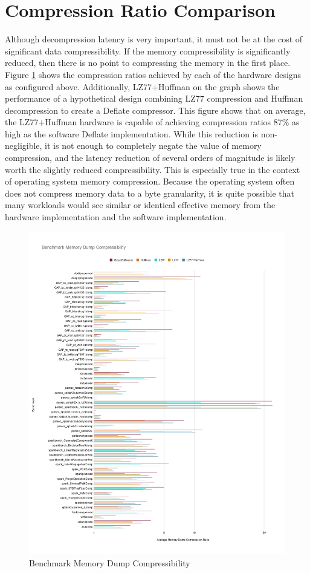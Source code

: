 \documentclass[doublespace,nopageskip]{VTthesis}
\begin{document}
\section{Compression Ratio Comparison}\label{se:compression_ratio_comparison_results}
Although decompression latency is very important, it must not be at the cost of significant data compressibility. If the memory compressibility is significantly reduced, then there is no point to compressing the memory in the first place. Figure \ref{fig:benchmark_memory_dump_compressibility} shows the compression ratios achieved by each of the hardware designs as configured above. Additionally, LZ77+Huffman on the graph shows the performance of a hypothetical design combining LZ77 compression and Huffman decompression to create a Deflate compressor. This figure shows that on average, the LZ77+Huffman hardware is capable of achieving compression ratios 87\% as high as the software Deflate implementation. While this reduction is non-negligible, it is not enough to completely negate the value of memory compression, and the latency reduction of several orders of magnitude is likely worth the slightly reduced compressibility. This is especially true in the context of operating system memory compression. Because the operating system often does not compress memory data to a byte granularity, it is quite possible that many workloads would see similar or identical effective memory from the hardware implementation and the software implementation.

\begin{figure}[htb]
	\centering
	\includegraphics[scale=0.357]{Benchmark Memory Dump Compressibility.png}
	\caption{Benchmark Memory Dump Compressibility}
	\label{fig:benchmark_memory_dump_compressibility}
\end{figure}
\end{document}
